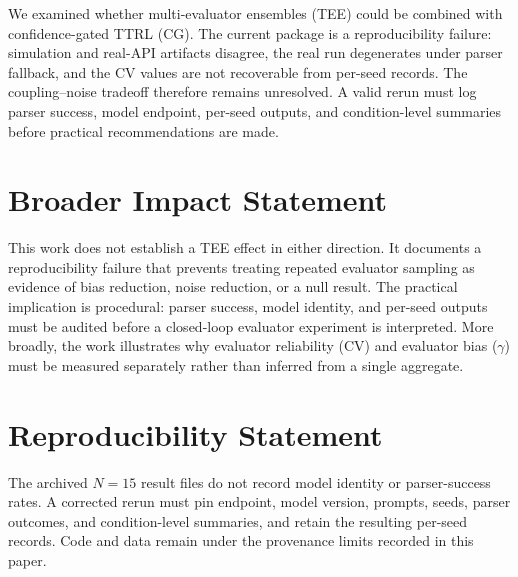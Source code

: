 \documentclass[11pt]{article}
\begin{document}
We examined whether multi-evaluator ensembles (TEE) could be combined with confidence-gated TTRL (CG). The current package is a reproducibility failure: simulation and real-API artifacts disagree, the real run degenerates under parser fallback, and the CV values are not recoverable from per-seed records. The coupling--noise tradeoff therefore remains unresolved. A valid rerun must log parser success, model endpoint, per-seed outputs, and condition-level summaries before practical recommendations are made.

\section*{Broader Impact Statement}

This work does not establish a TEE effect in either direction. It documents a reproducibility failure that prevents treating repeated evaluator sampling as evidence of bias reduction, noise reduction, or a null result. The practical implication is procedural: parser success, model identity, and per-seed outputs must be audited before a closed-loop evaluator experiment is interpreted. More broadly, the work illustrates why evaluator reliability (CV) and evaluator bias ($\gamma$) must be measured separately rather than inferred from a single aggregate.

\section*{Reproducibility Statement}
The archived $N{=}15$ result files do not record model identity or parser-success rates. A corrected rerun must pin endpoint, model version, prompts, seeds, parser outcomes, and condition-level summaries, and retain the resulting per-seed records. Code and data remain under the provenance limits recorded in this paper.





\end{document}
